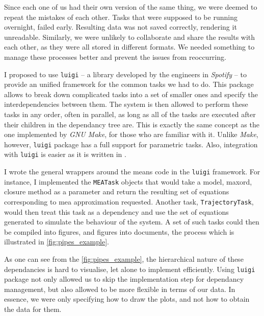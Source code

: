 Since each one of us had their own version of the same thing, we were deemed to repeat the mistakes of each other. 
Tasks that were supposed to be running overnight, failed early. Resulting data was not saved correctly, rendering it unreadable.
Similarly, we were unlikely to collaborate and share the results with each other, as they were all stored in different formats.
We needed something to manage these processes better and prevent the issues from reoccurring.

I proposed to use \verb"luigi"\cite{_luigi_????} -- a \python{} library developed by the engineers in \emph{Spotify} -- to provide an unified framework for the common tasks we had to do. 
This package allows to break down complicated tasks into a set of smaller ones and specify the interdependencies between them.
The system is then allowed to perform these tasks in any order, often in parallel, as long as all of the tasks are executed after their children in the dependancy tree are.
This is exactly the same concept as the one implemented by \emph{GNU Make}\cite{gnumake}, for those who are familiar with it. Unlike \emph{Make}, however, \verb"luigi" package has a full support for parametric tasks. Also, integration with \verb"luigi" is easier as it is written in \python{}.

I wrote the general wrappers around the means code in the \verb"luigi" framework. 
For instance, I implemented the \verb"MEATask" objects that would take a model, \gls{maxord}, closure method as a parameter and return the resulting set of equations corresponding to \gls{mea} approximation requested. 
Another task, \verb"TrajectoryTask", would then treat this task as a dependency and use the set of equations generated to simulate the behaviour of the system. 
A set of such tasks could then be compiled into figures, and figures into documents, the process which is illustrated in \autoref{fig:pipes_example}.

As one can see from the \autoref{fig:pipes_example}, the hierarchical nature of these dependancies is hard to visualise, let alone to implement efficiently.
Using {\tt luigi} package not only allowed us to skip the implementation step for dependancy management, but also allowed to be more flexible in terms of our data. In essence, we were only specifying how to draw the plots, and not how to obtain the data for them.

